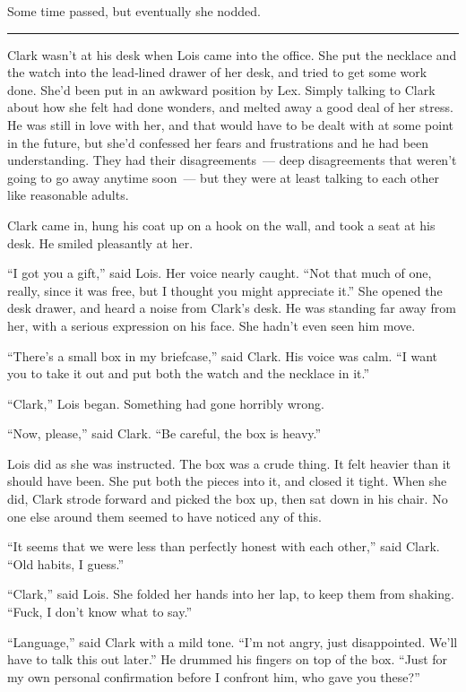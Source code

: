Some time passed, but eventually she nodded.

\begin{center}\rule{0.5\linewidth}{\linethickness}\end{center}

Clark wasn't at his desk when Lois came into the office. She put the
necklace and the watch into the lead‐lined drawer of her desk, and tried
to get some work done. She'd been put in an awkward position by Lex.
Simply talking to Clark about how she felt had done wonders, and melted
away a good deal of her stress. He was still in love with her, and that
would have to be dealt with at some point in the future, but she'd
confessed her fears and frustrations and he had been understanding. They
had their disagreements~--- deep disagreements that weren't going to go
away anytime soon~--- but they were at least talking to each other like
reasonable adults.

Clark came in, hung his coat up on a hook on the wall, and took a seat
at his desk. He smiled pleasantly at her.

``I got you a gift,'' said Lois. Her voice nearly caught. ``Not that
much of one, really, since it was free, but I thought you might
appreciate it.'' She opened the desk drawer, and heard a noise from
Clark's desk. He was standing far away from her, with a serious
expression on his face. She hadn't even seen him move.

``There's a small box in my briefcase,'' said Clark. His voice was calm.
``I want you to take it out and put both the watch and the necklace in
it.''

``Clark,'' Lois began. Something had gone horribly wrong.

``Now, please,'' said Clark. ``Be careful, the box is heavy.''

Lois did as she was instructed. The box was a crude thing. It felt
heavier than it should have been. She put both the pieces into it, and
closed it tight. When she did, Clark strode forward and picked the box
up, then sat down in his chair. No one else around them seemed to have
noticed any of this.

``It seems that we were less than perfectly honest with each other,''
said Clark. ``Old habits, I guess.''

``Clark,'' said Lois. She folded her hands into her lap, to keep them
from shaking. ``Fuck, I don't know what to say.''

``Language,'' said Clark with a mild tone. ``I'm not angry, just
disappointed. We'll have to talk this out later.'' He drummed his
fingers on top of the box. ``Just for my own personal confirmation
before I confront him, who gave you these?''

